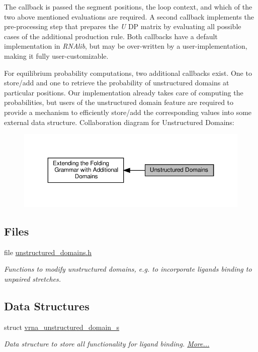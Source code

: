 The callback is passed the segment positions, the loop context, and which of the two above mentioned evaluations are required. A second callback implements the pre-\/processing step that prepares the {\itshape U} DP matrix by evaluating all possible cases of the additional production rule. Both callbacks have a default implementation in {\itshape R\+N\+Alib}, but may be over-\/written by a user-\/implementation, making it fully user-\/customizable.

For equilibrium probability computations, two additional callbacks exist. One to store/add and one to retrieve the probability of unstructured domains at particular positions. Our implementation already takes care of computing the probabilities, but users of the unstructured domain feature are required to provide a mechanism to efficiently store/add the corresponding values into some external data structure. Collaboration diagram for Unstructured Domains\+:
\nopagebreak
\begin{figure}[H]
\begin{center}
\leavevmode
\includegraphics[width=350pt]{group__domains__up}
\end{center}
\end{figure}
\subsection*{Files}
\begin{DoxyCompactItemize}
\item 
file \hyperlink{unstructured__domains_8h}{unstructured\+\_\+domains.\+h}
\begin{DoxyCompactList}\small\item\em Functions to modify unstructured domains, e.\+g. to incorporate ligands binding to unpaired stretches. \end{DoxyCompactList}\end{DoxyCompactItemize}
\subsection*{Data Structures}
\begin{DoxyCompactItemize}
\item 
struct \hyperlink{group__domains__up_structvrna__unstructured__domain__s}{vrna\+\_\+unstructured\+\_\+domain\+\_\+s}
\begin{DoxyCompactList}\small\item\em Data structure to store all functionality for ligand binding.  \hyperlink{group__domains__up_structvrna__unstructured__domain__s}{More...}\end{DoxyCompactList}\end{DoxyCompactItemize}
